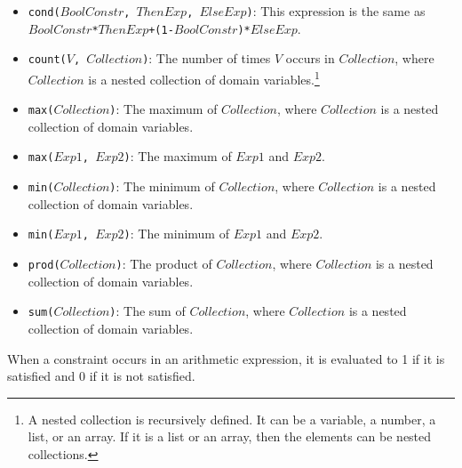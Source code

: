 \begin{itemize}
\item \texttt{cond($BoolConstr$, $ThenExp$, $ElseExp$)}: This expression is the same as\\ \texttt{$BoolConstr$*$ThenExp$+(1-$BoolConstr$)*$ElseExp$}.
\item \texttt{count($V$, $Collection$)}: The number of times $V$ occurs in $Collection$, where $Collection$ is a nested collection of domain variables.\footnote{A nested collection is recursively defined. It can be a variable, a number, a list, or an array. If it is a list or an array, then the elements can be nested collections.}
\item \texttt{max($Collection$)}: The maximum of $Collection$, where $Collection$ is a nested collection of domain variables.
\item \texttt{max($Exp1$, $Exp2$)}: The maximum of $Exp1$ and $Exp2$.
\item \texttt{min($Collection$)}: The minimum of $Collection$, where $Collection$ is a nested collection of domain variables.
\item \texttt{min($Exp1$, $Exp2$)}: The minimum of $Exp1$ and $Exp2$.
\item \texttt{prod($Collection$)}: The product of $Collection$, where $Collection$ is a nested collection of domain variables.
\item \texttt{sum($Collection$)}: The sum of $Collection$, where $Collection$ is a nested collection of domain variables.
\end{itemize}
When a constraint occurs in an arithmetic expression, it is evaluated to 1 if it is satisfied and 0 if it is not satisfied.

